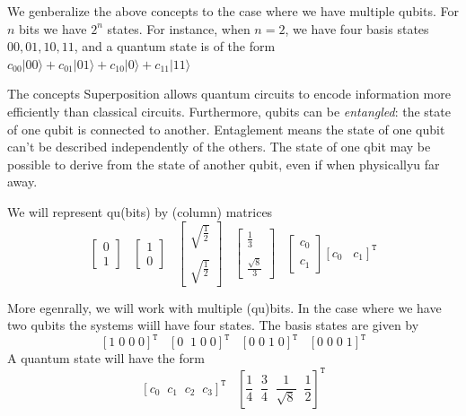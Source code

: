 We genberalize the above concepts to the case where we have multiple qubits.
%
For $n$ bits we have $2^n$ states.
%
For instance, when $n=2$, we have four basis states $00,01,10,11$, and a quantum state is of the form $c_{00}|00\rangle+c_{01}|01\rangle+c_{10}|0\rangle+c_{11}|11\rangle$

The concepts
Superposition allows quantum circuits to encode information more efficiently than classical circuits. 
%
Furthermore, qubits can be {\it entangled}: the state of one qubit is connected to another. 
%
Entaglement means the state of one qubit can't be described independently of the others.
%
The state of one qbit may be possible to derive from the state of another qubit, even if when physicallyu far away.

We will represent qu(bits) by  (column) matrices
\[
\left[
\begin{array}{c}
0\\1
\end{array}
\right]
\;\;\;
\left[
\begin{array}{c}
1\\0
\end{array}
\right]
\;\;\;
\left[
\begin{array}{c}
\sqrt{\frac1 2}\\\\\sqrt{\frac1 2}
\end{array}
\right]
\;\;\;
\left[
\begin{array}{c}
\frac1 3\\\\\frac{\sqrt8}3
\end{array}
\right]
\;\;\;
\left[
\begin{array}{c}
c_0\\\\c_1
\end{array}
\right]
\left[
c_0\;\;\;c_1
\right]^{\mathtt T}
\]

More egenrally, we will work with multiple (qu)bits.
%
In the case where we have two qubits the systems wiill have four states.
%
The basis states are given by 
\[
\left[
1\;0\;0\;0
\right]^{\mathtt T}
\;\;\;
\left[
0\;\;1\;0\;0
\right]^{\mathtt T}
\;\;\;
\left[
0\;0\;1\;0
\right]^{\mathtt T}
\;\;\;
\left[
0\;0\;0\;1
\right]^{\mathtt T}
\]
A quantum state will have the form
\[
\left[
c_0\;\;c_1\;\;c_2\;\;c_3
\right]^{\mathtt T}
\;\;\;
\left[
\frac1 4\;\;\frac 3 4\;\;\frac 1 {\sqrt8}\;\;\frac 1 2
\right]^{\mathtt T}
\]


